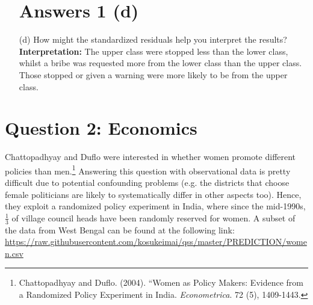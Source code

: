 \documentclass[12pt,letterpaper]{article}
\begin{document}
\begin{enumerate}
\section*{Answers 1 (d)}

	\item [(d)] How might the standardized residuals help you interpret the results?  \\
	
\textbf{Interpretation:} The upper class were stopped less than the lower class, whilst a bribe was requested more from the lower class than the upper class. Those stopped or given a warning were more likely to be from the upper class. 
	
\end{enumerate}
\newpage




\newpage

\section*{Question 2: Economics}
Chattopadhyay and Duflo were interested in whether women promote different policies than men.\footnote{Chattopadhyay and Duflo. (2004). ``Women as Policy Makers: Evidence from a Randomized Policy Experiment in India. \textit{Econometrica}. 72 (5), 1409-1443.} Answering this question with observational data is pretty difficult due to potential confounding problems (e.g. the districts that choose female politicians are likely to systematically differ in other aspects too). Hence, they exploit a randomized policy experiment in India, where since the mid-1990s, $\frac{1}{3}$ of village council heads have been randomly reserved for women. A subset of the data from West Bengal can be found at the following link: \url{https://raw.githubusercontent.com/kosukeimai/qss/master/PREDICTION/women.csv}\\
\end{document}
